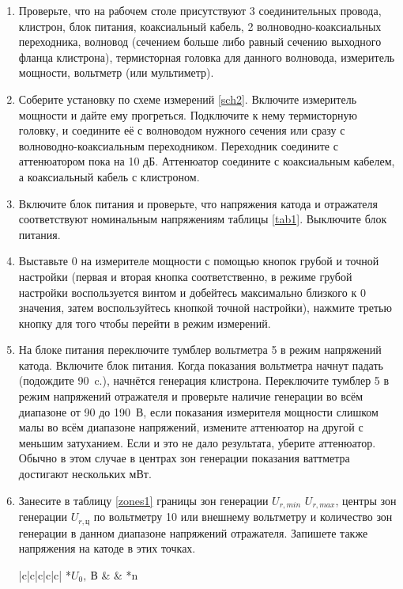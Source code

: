 \documentclass[a4paper,14pt]{extarticle}
\begin{document}
	\begin{enumerate}
		\item Проверьте, что на рабочем столе присутствуют 3 соединительных провода, клистрон, блок питания, коаксиальный кабель, 2 волноводно-коаксиальных переходника, волновод (сечением больше либо равный сечению выходного фланца клистрона), термисторная головка для данного волновода, измеритель мощности, вольтметр (или мультиметр).
		\item Соберите установку по схеме измерений \ref{sch2}. Включите измеритель мощности и дайте ему прогреться. Подключите к нему термисторную головку, и соедините её с волноводом нужного сечения или сразу с волноводно-коаксиальным переходником. Переходник соедините с аттенюатором пока на 10 дБ. Аттенюатор соедините с коаксиальным кабелем, а коаксиальный кабель с клистроном.
		\item Включите блок питания и проверьте, что напряжения катода и отражателя соответствуют номинальным напряжениям таблицы \ref{tab1}. Выключите блок питания.
		\item Выставьте 0 на измерителе мощности с помощью кнопок грубой и точной настройки (первая и вторая кнопка соответственно, в режиме грубой настройки воспользуется винтом и добейтесь максимально близкого к 0 значения, затем воспользуйтесь кнопкой точной настройки), нажмите третью кнопку для того чтобы перейти в режим измерений.
		\item На блоке питания переключите тумблер вольтметра 5 в режим напряжений катода. Включите блок питания. Когда показания вольтметра начнут падать (подождите 90~c.), начнётся генерация клистрона. Переключите тумблер 5 в режим напряжений отражателя и проверьте наличие генерации во всём диапазоне от 90 до 190~В, если показания измерителя мощности слишком малы во всём диапазоне напряжений, измените аттенюатор на другой с меньшим затуханием. Если и это не дало результата, уберите аттенюатор. Обычно в этом случае в центрах зон генерации показания ваттметра достигают нескольких мВт.
		\item Занесите в таблицу \ref{zones1} границы зон генерации $U_{r, min}$ $U_{r, max}$, центры зон генерации $U_{r, \text{ц}}$ по вольтметру 10 или внешнему вольтметру и количество зон генерации в данном диапазоне напряжений отражателя. Запишете также напряжения на катоде в этих точках. 
		\begin{table}[h]
			\center
			\caption{Определение зон генерации}
			\label{zones1}
			\begin{tabular}{|c|c|c|c|c|}\hline
				*{$U_0,~\text{В}$} &  & *{n} \\ 

\end{tabular}
\end{table}
\end{enumerate}
\end{document}
